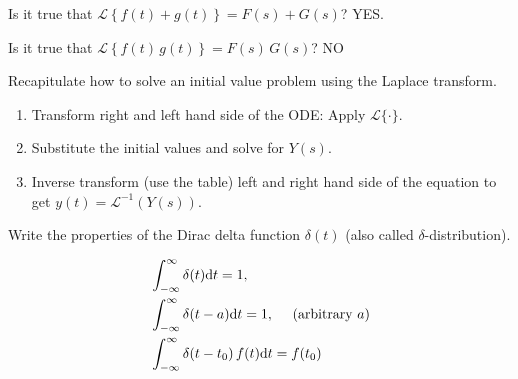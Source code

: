 {\begin{iii}
\item Is it true that $\mathcal{L}\left\{f(t)+g(t)\right\} = F(s)+G(s)$? YES.

\item Is it true that $\mathcal{L}\left\{f(t)\,g(t)\right\} = F(s)\,G(s)$? NO

\item Recapitulate how to solve an initial value problem using the Laplace transform.

\renewcommand{\labelenumi}{\arabic{enumi}}
 \setcounter{enumi}{0}
\begin{enumerate}
\item Transform right and left hand side of the ODE: Apply $\mathcal{L}\{\cdot\}$.
\item Substitute the initial values and solve for $Y(s)$.
\item Inverse transform (use the table) left and right hand side of the equation to get $y(t)=\mathcal{L}^{-1}(Y(s))$.
\end{enumerate}

\item Write the properties of the Dirac delta function $\delta(t)$ (also called $\delta$-distribution).

\begin{align*}
&\int_{-\infty}^\infty \delta(t) \mathrm{d} t = 1, \\
&\int_{-\infty}^\infty \delta(t-a) \mathrm{d} t = 1, \quad \text{ (arbitrary } a)\\
&\int_{-\infty}^\infty \delta(t-t_0)\, f(t) \mathrm{d} t = f(t_0)\\
\end{align*}

\end{iii}

}



